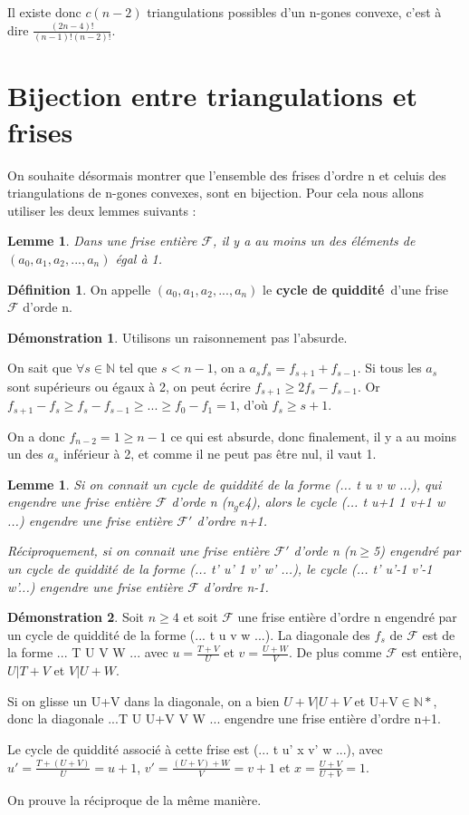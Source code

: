 \documentclass[a4paper]{article}
\theoremstyle{plain}
\newtheorem{lem}[thm]{Lemme}
\theoremstyle{definition}
\newtheorem{defn}{Définition}[section]
\theoremstyle{proof}
\newtheorem{dem}{Démonstration}
\theoremstyle{remark}
\begin{document}
Il existe donc $c(n-2)$ triangulations possibles d'un n-gones convexe, c'est à dire $\frac{(2n-4)!}{(n-1)!(n-2)!}$.

\section{Bijection entre triangulations et frises}
On souhaite désormais montrer que l'ensemble des frises d'ordre n et celuis des triangulations de n-gones convexes, sont en bijection. Pour cela nous allons utiliser les deux lemmes suivants :

\begin{lem}
Dans une frise entière $\mathcal{F}$, il y a au moins un des éléments de $(a_0,a_1,a_2,...,a_n)$ égal à 1.
\end{lem}

\begin{defn}
On appelle $(a_0,a_1,a_2,...,a_n)$ le \textbf{cycle de quiddité}\ d'une frise $\mathcal{F}$ d'orde n.
\end{defn}

\begin{dem}
Utilisons un raisonnement pas l'absurde.

On sait que $\forall s \in \mathbb{N}$ tel que $s<n-1$, on a $a_sf_s=f_{s+1}+f_{s-1}$. Si tous les $a_s$ sont supérieurs ou égaux à 2, on peut écrire $f_{s+1}\ge 2f_s-f_{s-1}$.
Or $f_{s+1}-f_s\ge f_s-f_{s-1}\ge ... \ge f_0-f_1=1$, d'où $f_s\ge s+1$.

On a donc  $f_{n-2}=1\ge n-1$ ce qui est absurde, donc finalement, il y a au moins un des $a_s$ inférieur à 2, et comme il ne peut pas être nul, il vaut 1.
\end{dem}

\begin{lem}
Si on connait un  cycle de quiddité de la forme (... t u v w ...), qui engendre une frise entière $\mathcal{F}$ d'orde n (n$_ge$4), alors le cycle (... t u+1 1 v+1 w ...) engendre une frise entière $\mathcal{F'}$ d'ordre n+1.

Réciproquement, si on connait une frise entière $\mathcal{F'}$ d'orde n (n$\ge$5) engendré par un cycle de quiddité de la forme (... t' u' 1 v' w' ...), le cycle (... t' u'-1 v'-1 w'...) engendre une frise entière $\mathcal{F}$ d'ordre n-1.
\end{lem}

\begin{dem}
Soit $n \ge 4$ et soit $\mathcal{F}$ une frise entière d'ordre n engendré par un cycle de quiddité de la forme (... t u v w ...). La diagonale des $f_s$ de $\mathcal{F}$ est de la forme ... T U V W ... avec $u=\frac{T+V}{U}$ et $v=\frac{U+W}{V}$. De plus comme $\mathcal{F}$ est entière, $U|T+V$ et $V|U+W$.

Si on glisse un U+V dans la diagonale, on a bien $U+V|U+V$ et U+V$\in \mathbb{N*}$, donc la diagonale ...T U U+V V W ... engendre une frise entière d'ordre n+1.

Le cycle de quiddité associé à cette frise est (... t u' x v' w ...), avec $u'=\frac{T+(U+V)}{U}=u+1$, $v'=\frac{(U+V)+W}{V}=v+1$ et $x=\frac{U+V}{U+V}=1$.

On prouve la réciproque de la même manière.
\end{dem}
\end{document}
